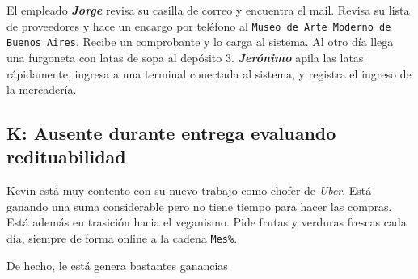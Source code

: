 El empleado \textbf{\emph{Jorge}} revisa su casilla de correo y encuentra el
mail. Revisa su lista de proveedores y hace un encargo por teléfono al
\texttt{Museo de Arte Moderno de Buenos Aires}. Recibe un comprobante y lo
carga al sistema. Al otro día llega una furgoneta con latas de sopa al
depósito 3. \textbf{\emph{Jerónimo}} apila las latas rápidamente, ingresa a
una terminal conectada al sistema, y registra el ingreso de la mercadería.

\subsection{K: Ausente durante entrega evaluando redituabilidad}

Kevin está muy contento con su nuevo trabajo como chofer de \textit{Uber}.
Está ganando una suma considerable pero no tiene tiempo para hacer las
compras. Está además en trasición hacia el veganismo. Pide frutas y verduras
frescas cada día, siempre de forma online a la cadena \texttt{Mes\%}.

De hecho, le está genera bastantes ganancias 




